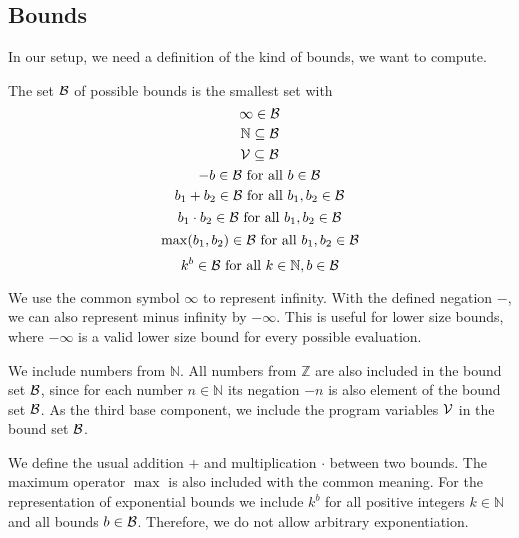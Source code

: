 \subsection{Bounds}

In our setup, we need a definition of the kind of bounds, we want to compute.

\begin{definition}
  The set $\mathcal{B}$ of possible bounds is the smallest set with
  \[ \infty \in \mathcal{B} \]
  \[ \mathbb{N} \subseteq \mathcal{B} \] 
  \[ \mathcal{V} \subseteq \mathcal{B} \] 
  \[ -b \in \mathcal{B} \text{ for all } b \in \mathcal{B} \] 
  \[ b_1 + b_2 \in \mathcal{B} \text{ for all } b_1, b_2 \in \mathcal{B} \] 
  \[ b_1 \cdot b_2 \in \mathcal{B} \text{ for all } b_1, b_2 \in \mathcal{B} \] 
  \[ \max(b_1, b_2) \in \mathcal{B} \text{ for all } b_1, b_2 \in \mathcal{B} \]
  \[ k^b \in \mathcal{B} \text{ for all } k \in \mathbb{N}, b \in \mathcal{B} \]
\end{definition}

We use the common symbol $\infty$ to represent infinity.
With the defined negation $-$, we can also represent minus infinity by $-\infty$.
This is useful for lower size bounds, where $-\infty$ is a valid lower size bound for every possible evaluation.

We include numbers from $\mathbb{N}$.
All numbers from $\mathbb{Z}$ are also included in the bound set $\mathcal{B}$, since for each number $n \in \mathbb{N}$ its negation $-n$ is also element of the bound set $\mathcal{B}$.
As the third base component, we include the program variables $\mathcal{V}$ in the bound set $\mathcal{B}$.

We define the usual addition $+$ and multiplication $\cdot$ between two bounds.
The maximum operator $\max$ is also included with the common meaning.
For the representation of exponential bounds we include $k^b$ for all positive integers $k \in \mathbb{N}$ and all bounds $b \in \mathcal{B}$.
Therefore, we do not allow arbitrary exponentiation.

